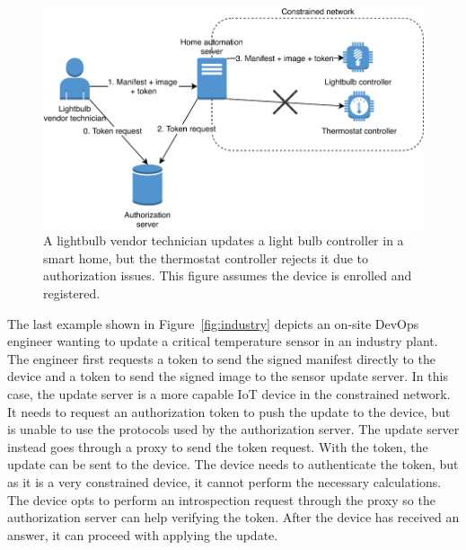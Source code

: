 \documentclass[0-thesis.tex]{subfiles}
\begin{document}
\begin{figure}[t]
    \caption[A lightbulb vendor technician updates a light bulb controller in a smart
    home.]
        {A lightbulb vendor technician updates a light bulb controller in a smart
                home, but the thermostat controller rejects it due to authorization
                issues. This figure assumes the device is enrolled and registered.}
    \label{fig:smart-home}
    \includegraphics{images/use-case-smart-home.pdf}
\end{figure}

The last example shown in Figure~\ref{fig:industry} depicts an on-site DevOps engineer
wanting to update a critical temperature sensor in an industry plant. The engineer first
requests a token to send the signed manifest directly to the device and a token to send
the signed image to the sensor update server. In this case, the update server is a more
capable IoT device in the constrained network. It needs to request an authorization token
to push the update to the device, but is unable to use the protocols used by the
authorization server. The update server instead goes through a proxy to send the token
request. With the token, the update can be sent to the device. The device needs to
authenticate the token, but as it is a very constrained device, it cannot perform the
necessary calculations. The device opts to perform an introspection request through the
proxy so the authorization server can help verifying the token. After the device has
received an answer, it can proceed with applying the update.
\end{document}
